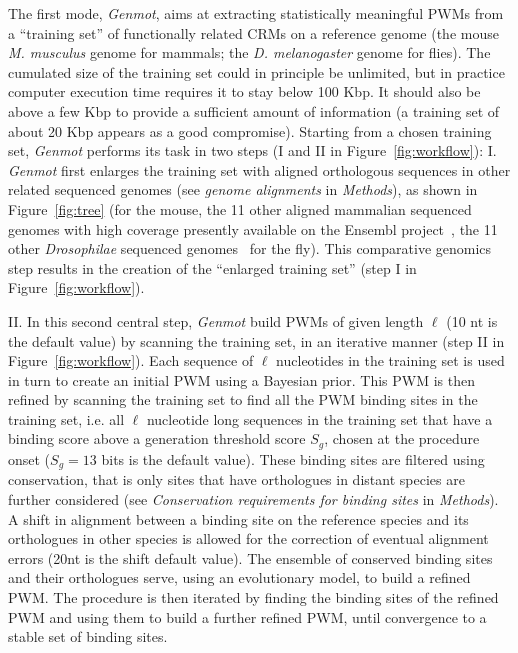 \documentclass[a4,center,fleqn]{NAR}
\begin{document}
The first mode, {\em Genmot}, aims at extracting statistically meaningful PWMs
from a ``training set'' of functionally related CRMs on a reference genome (the
mouse {\em M. musculus} genome for mammals;  the {\em D. melanogaster} genome
for flies). 
The cumulated size of the training set could in principle be unlimited, but in
practice computer execution time requires it to stay below 100 Kbp.
It should also be above  a few Kbp to provide a sufficient amount of
information (a training set of about
20 Kbp appears as a good compromise).
Starting from a chosen training set, {\em Genmot}  performs its task in two
steps (I and II in  Figure~\ref{fig:workflow}): 
  I. {\em Genmot}  first enlarges the training set with aligned orthologous
  sequences in other related sequenced genomes (see {\em genome alignments} in
  {\em Methods}), as shown in Figure~\ref{fig:tree} (for the mouse, the 11
  other aligned mammalian sequenced genomes with high coverage presently
  available on the Ensembl project~\cite{Flicek2012fk},  the 11 other {\em
  Drosophilae} sequenced genomes~\cite{clark2007evolution} for the fly).
  This comparative genomics step results in the creation of the ``enlarged
  training set'' (step I in Figure~\ref{fig:workflow}).

  II. In this second central step, {\em Genmot}  build PWMs of given length
  $\ell$ (10 nt is the default value) by scanning the training set, in an
  iterative manner (step II  in  Figure~\ref{fig:workflow}).
  Each sequence of $\ell$ nucleotides in the training set is used in turn to
  create an initial PWM using a Bayesian prior.
  This PWM is then refined by scanning the  training set to find all the
  PWM binding sites in the training set, i.e. all $\ell$ nucleotide long
  sequences in the training set that have a binding score above a generation
  threshold score $S_g$, chosen at the procedure onset ($S_g=13$ bits is the
  default value).
  These binding sites are filtered using conservation,  that is only sites that
  have orthologues in distant species are further considered (see {\em
  Conservation requirements for binding sites} in {\em Methods}).
  A shift in alignment between a binding site on the reference species and its
  orthologues in other species is allowed for the correction of eventual
  alignment errors (20nt is the shift default value).
  The ensemble of conserved binding sites and their orthologues  serve, using
  an evolutionary model, to build a refined PWM.
  The procedure is then iterated by finding the binding sites of the refined
  PWM and using them to build a further refined PWM, until convergence to
  a stable set of binding sites.
\end{document}
